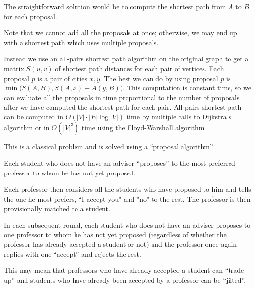 The straightforward solution would be to compute the shortest path 
from $A$ to $B$ for each proposal.

Note that we cannot add all the proposals at once; otherwise, we may end up with a shortest path which  uses
multiple proposals.

Instead we use an all-pairs shortest path algorithm on the original graph
to get a matrix $S(u,v)$ of shortest path distances for each
pair of vertices.  Each proposal $p$ is a pair of cities
$x,y$.  The best we can do by using proposal $p$ is $\min\big(S(A,B), S(A,x) + A(y,B)\big)$.
This computation is constant time, so we can 
evaluate all the proposals in time proportional to the number of 
proposals after we have computed the shortest path for each pair. 
All-pairs shortest path can be computed in  $O(|V|\cdot|E|\log |V|)$ time
 by multiple calls to Dijkstra's algorithm or in $O(|V|^3)$ time using the Floyd-Warshall algorithm.


This is a classical problem and is solved using a ``proposal algorithm''.

Each student who does not have an adviser ``proposes'' to the most-preferred 
professor to whom he has not yet proposed. 

Each professor then considers all the students who have proposed to him and tells the 
one he most prefers, ``I accept you" and "no" to the rest. 
The professor is then provisionally matched to a student. 

In each subsequent round, each student who does not have an adviser proposes to one professor
to whom he has not yet proposed (regardless of whether the professor has already accepted 
a student or not)  
and the professor once again replies with one ``accept'' and rejects the rest. 

This may mean that professors who have already accepted a student can ``trade-up'' and students who have already been accepted by a professor can be ``jilted''.

